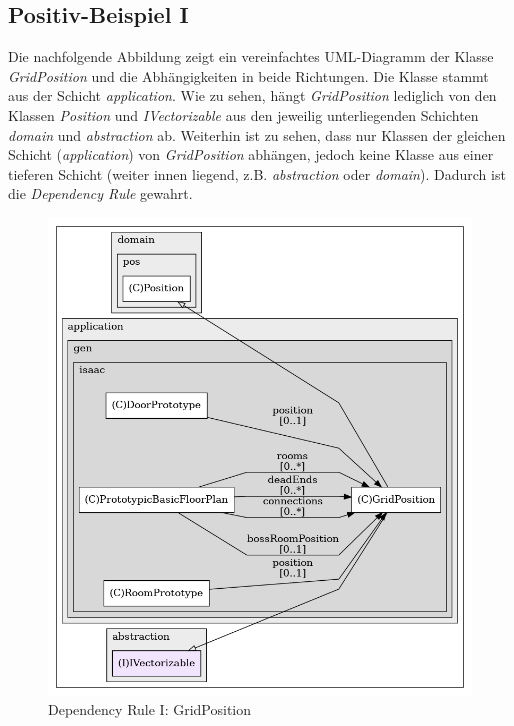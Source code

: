 \pagebreak
\subsection*{Positiv-Beispiel I}
Die nachfolgende Abbildung zeigt ein vereinfachtes UML-Diagramm der
Klasse \textit{GridPosition} und die Abhängigkeiten in beide Richtungen.
Die Klasse stammt aus der Schicht \textit{application}.
Wie zu sehen, hängt \textit{GridPosition} lediglich von den Klassen
\textit{Position} und \textit{IVectorizable} aus den jeweilig 
unterliegenden Schichten \textit{domain} und \textit{abstraction} ab.
Weiterhin ist zu sehen, dass nur Klassen der gleichen Schicht
(\textit{application}) von \textit{GridPosition} abhängen, jedoch
keine Klasse aus einer tieferen Schicht (weiter innen liegend, z.B.
\textit{abstraction} oder \textit{domain}). Dadurch ist die
\textit{Dependency Rule} gewahrt.

\vspace{0.5cm}
\begin{figure}[H]
    \centering
    \includegraphics[width=0.8\linewidth]{Bilder/Visualisierung/GridPosition_structure.png}
    \caption{Dependency Rule I: GridPosition}
\end{figure}

